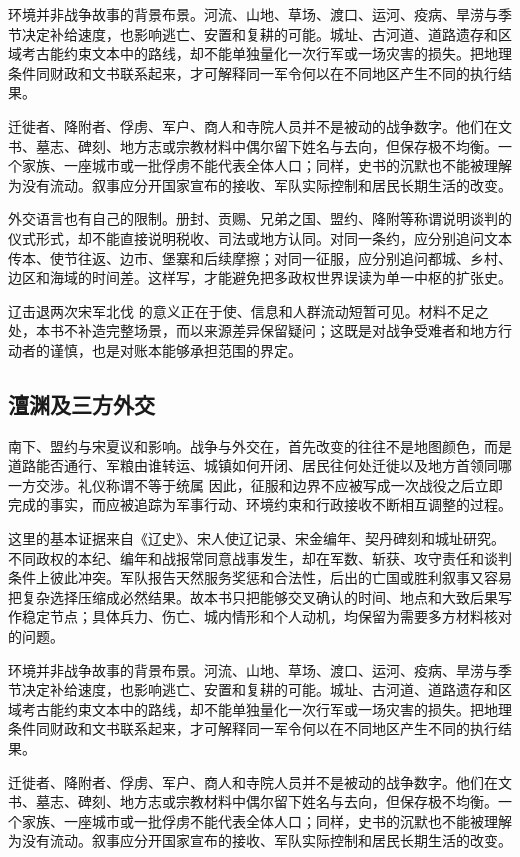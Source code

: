 环境并非战争故事的背景布景。河流、山地、草场、渡口、运河、疫病、旱涝与季节决定补给速度，也影响逃亡、安置和复耕的可能。城址、古河道、道路遗存和区域考古能约束文本中的路线，却不能单独量化一次行军或一场灾害的损失。把地理条件同财政和文书联系起来，才可解释同一军令何以在不同地区产生不同的执行结果。

迁徙者、降附者、俘虏、军户、商人和寺院人员并不是被动的战争数字。他们在文书、墓志、碑刻、地方志或宗教材料中偶尔留下姓名与去向，但保存极不均衡。一个家族、一座城市或一批俘虏不能代表全体人口；同样，史书的沉默也不能被理解为没有流动。叙事应分开国家宣布的接收、军队实际控制和居民长期生活的改变。

外交语言也有自己的限制。册封、贡赐、兄弟之国、盟约、降附等称谓说明谈判的仪式形式，却不能直接说明税收、司法或地方认同。对同一条约，应分别追问文本传本、使节往返、边市、堡寨和后续摩擦；对同一征服，应分别追问都城、乡村、边区和海域的时间差。这样写，才能避免把多政权世界误读为单一中枢的扩张史。

辽击退两次宋军北伐 的意义正在于使、信息和人群流动短暂可见。材料不足之处，本书不补造完整场景，而以来源差异保留疑问；这既是对战争受难者和地方行动者的谨慎，也是对账本能够承担范围的界定。

\subsection{澶渊及三方外交}

南下、盟约与宋夏议和影响。战争与外交在，首先改变的往往不是地图颜色，而是道路能否通行、军粮由谁转运、城镇如何开闭、居民往何处迁徙以及地方首领同哪一方交涉。礼仪称谓不等于统属 因此，征服和边界不应被写成一次战役之后立即完成的事实，而应被追踪为军事行动、环境约束和行政接收不断相互调整的过程。

这里的基本证据来自《辽史》、宋人使辽记录、宋金编年、契丹碑刻和城址研究。不同政权的本纪、编年和战报常同意战事发生，却在军数、斩获、攻守责任和谈判条件上彼此冲突。军队报告天然服务奖惩和合法性，后出的亡国或胜利叙事又容易把复杂选择压缩成必然结果。故本书只把能够交叉确认的时间、地点和大致后果写作稳定节点；具体兵力、伤亡、城内情形和个人动机，均保留为需要多方材料核对的问题。

环境并非战争故事的背景布景。河流、山地、草场、渡口、运河、疫病、旱涝与季节决定补给速度，也影响逃亡、安置和复耕的可能。城址、古河道、道路遗存和区域考古能约束文本中的路线，却不能单独量化一次行军或一场灾害的损失。把地理条件同财政和文书联系起来，才可解释同一军令何以在不同地区产生不同的执行结果。

迁徙者、降附者、俘虏、军户、商人和寺院人员并不是被动的战争数字。他们在文书、墓志、碑刻、地方志或宗教材料中偶尔留下姓名与去向，但保存极不均衡。一个家族、一座城市或一批俘虏不能代表全体人口；同样，史书的沉默也不能被理解为没有流动。叙事应分开国家宣布的接收、军队实际控制和居民长期生活的改变。

